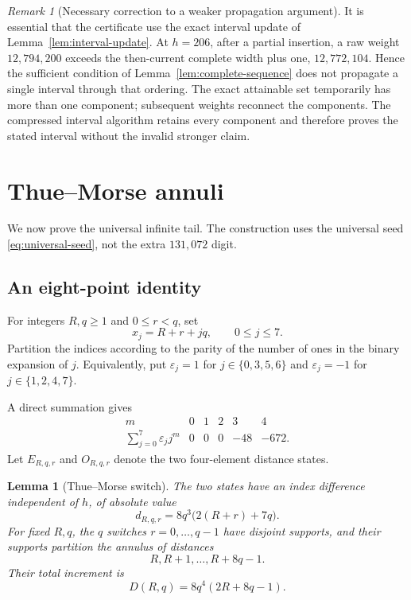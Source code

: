 \documentclass[11pt]{article}
\newtheorem{lemma}[theorem]{Lemma}
\theoremstyle{definition}
\theoremstyle{remark}
\newtheorem{remark}[theorem]{Remark}
\begin{document}
\begin{remark}[Necessary correction to a weaker propagation argument]
It is essential that the certificate use the exact interval update of
Lemma~\ref{lem:interval-update}.  At $h=206$, after a partial insertion, a raw
weight $12{,}794{,}200$ exceeds the then-current complete width plus one,
$12{,}772{,}104$.  Hence the sufficient condition of
Lemma~\ref{lem:complete-sequence} does not propagate a single interval through
that ordering.  The exact attainable set temporarily has more than one
component; subsequent weights reconnect the components.  The compressed
interval algorithm retains every component and therefore proves the stated
interval without the invalid stronger claim.
\end{remark}

\section{Thue--Morse annuli}

We now prove the universal infinite tail.  The construction uses the universal
seed \eqref{eq:universal-seed}, not the extra $131{,}072$ digit.

\subsection{An eight-point identity}

For integers $R,q\ge1$ and $0\le r<q$, set
\[
  x_j=R+r+jq,
  \qquad 0\le j\le7.
\]
Partition the indices according to the parity of the number of ones in the
binary expansion of $j$.  Equivalently, put $\varepsilon_j=1$ for
$j\in\{0,3,5,6\}$ and $\varepsilon_j=-1$ for
$j\in\{1,2,4,7\}$.

A direct summation gives
\begin{equation}\label{eq:tm-moments}
\begin{array}{c|rrrrr}
 m&0&1&2&3&4\\ \hline
 \sum_{j=0}^{7}\varepsilon_jj^m&0&0&0&-48&-672.
\end{array}
\end{equation}
Let $E_{R,q,r}$ and $O_{R,q,r}$ denote the two four-element distance states.

\begin{lemma}[Thue--Morse switch]\label{lem:tm-switch}
The two states have an index difference independent of $h$, of absolute value
\begin{equation}\label{eq:tm-digit}
  d_{R,q,r}=8q^3\bigl(2(R+r)+7q\bigr).
\end{equation}
For fixed $R,q$, the $q$ switches $r=0,\ldots,q-1$ have disjoint supports,
and their supports partition the annulus of distances
\[
  R,R+1,\ldots,R+8q-1.
\]
Their total increment is
\begin{equation}\label{eq:annulus-total}
  D(R,q)=8q^4(2R+8q-1).
\end{equation}
\end{lemma}
\end{document}
